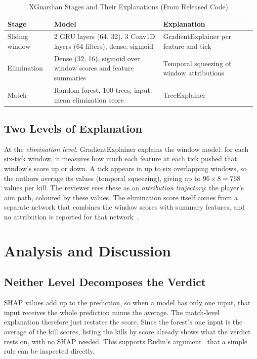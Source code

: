 \documentclass[conference]{IEEEtran}
\begin{document}
\begin{table}[htbp]
\caption{XGuardian Stages and Their Explanations (From Released Code)}
\begin{center}
\begin{tabular}{@{}p{1.55cm}p{3.05cm}p{2.9cm}@{}}
\toprule
\textbf{Stage} & \textbf{Model} & \textbf{Explanation} \\
\midrule
Sliding window & 2 GRU layers (64, 32), 3 Conv1D layers (64 filters), dense, sigmoid & GradientExplainer per feature and tick \\
Elimination & Dense (32, 16), sigmoid over window scores and feature summaries & Temporal squeezing of window attributions \\
Match & Random forest, 100 trees, input: mean elimination score & TreeExplainer \\
\bottomrule
\end{tabular}
\label{tab:pipeline}
\end{center}
\end{table}

\subsection{Two Levels of Explanation}
At the \emph{elimination level}, GradientExplainer explains the window model: for each six-tick window, it measures how much each feature at each tick pushed that window's score up or down. A tick appears in up to six overlapping windows, so the authors average its values
(temporal squeezing), giving up to $96\times8=768$ values per kill. 
The reviewer sees these as an \emph{attribution trajectory}: the player's aim path, coloured by these values. The elimination score itself comes
from a separate network that combines the window scores with summary features, and no attribution is reported for that network~\cite{zhang2026xguardian}.
\section{Analysis and Discussion}

\subsection{Neither Level Decomposes the Verdict}

SHAP values add up to the prediction, so when a model has only one input, that input receives the whole prediction minus the average. 
The match-level explanation therefore just restates the score. 
Since the forest's one input is the average of the kill scores, listing the kills by score already shows what the verdict rests on, with no SHAP needed. 
This supports Rudin's argument~\cite{rudin2019stop} that a simple rule can be inspected directly.
\end{document}
